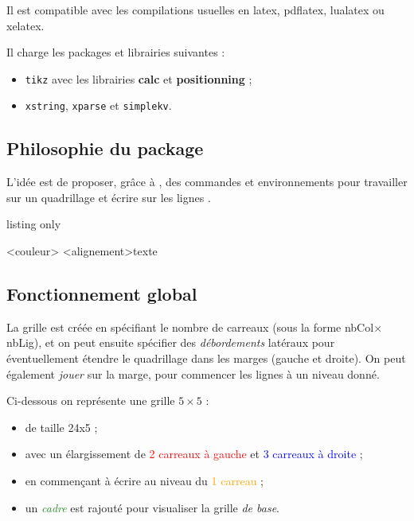 \documentclass[a4paper]{article}
\newcommand\Cle[1]{{\bfseries\sffamily\textlangle #1\textrangle}}
\begin{document}
Il est compatible avec les compilations usuelles en \textsf{latex}, \textsf{pdflatex}, \textsf{lualatex} ou \textsf{xelatex}.

\medskip

Il charge les packages et librairies suivantes :

\begin{itemize}
	\item \texttt{tikz} avec les librairies \Cle{calc} et \Cle{positionning} ;
	\item \texttt{xstring}, \texttt{xparse} et  \texttt{simplekv}.
\end{itemize}

\subsection{\og Philosophie \fg{} du package}

L'idée est de proposer, grâce à \TikZ, des \textsf{commandes} et \textsf{environnements} pour travailler sur un quadrillage et écrire \og sur les lignes \fg.

\begin{PresentationCode}{listing only}

\begin{EnvQuadrillage}[clés]<couleur>
	\EcrireLigne[clés]<alignement>{texte}
	\PasseLigne
\end{EnvQuadrillage}
\end{PresentationCode}

\subsection{Fonctionnement global}

La grille est créée en spécifiant le nombre de carreaux (sous la forme nbCol$\times$nbLig), et on peut ensuite spécifier des \textit{débordements} latéraux pour éventuellement étendre le quadrillage dans les marges (gauche et droite). On peut également \textit{jouer} sur la marge, pour commencer les lignes à un niveau donné.

\medskip

Ci-dessous on représente une grille $5\times5$ :

\begin{itemize}
	\item de taille 24x5 ;
	\item avec un élargissement de \textcolor{red}{2 carreaux à gauche} et \textcolor{blue}{3 carreaux à droite} ;
	\item en commençant à écrire au niveau du \textcolor{orange}{1 carreau} ;
	\item un \textcolor{ForestGreen}{\textit{cadre}} est rajouté pour visualiser la grille \textit{de base}.
\end{itemize}
\end{document}
